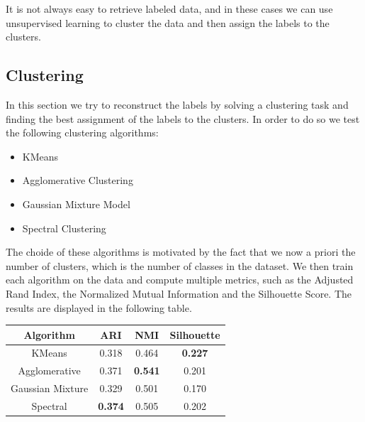 It is not always easy to retrieve labeled data, and in these cases we
can use unsupervised learning to cluster the data and then assign the
labels to the clusters.

\subsection{Clustering}
In this section we try to reconstruct the labels by solving a clustering task
and finding the best assignment of the labels to the clusters. In order
to do so we test the following clustering algorithms:
\begin{itemize}
    \item KMeans
    \item Agglomerative Clustering
    \item Gaussian Mixture Model
    \item Spectral Clustering
\end{itemize}

The choide of these algorithms is motivated by the fact that we now
a priori the number of clusters, which is the number of classes in the
dataset. We then train each algorithm on the data and compute multiple
metrics, such as the Adjusted Rand Index, the Normalized Mutual Information and
the Silhouette Score. The results are displayed in the following table.
\begin{table}[H]
    \centering
    \begin{tabular}{|c|c|c|c|}
        \hline
        Algorithm          & ARI   & NMI   & Silhouette \\
        \hline
        KMeans             & 0.318 & 0.464 & \textbf{0.227} \\
        Agglomerative      & 0.371 & \textbf{0.541} & 0.201 \\
        Gaussian Mixture   & 0.329 & 0.501 & 0.170 \\
        Spectral           & \textbf{0.374} & 0.505 & 0.202 \\
        \hline
    \end{tabular}
\end{table}

